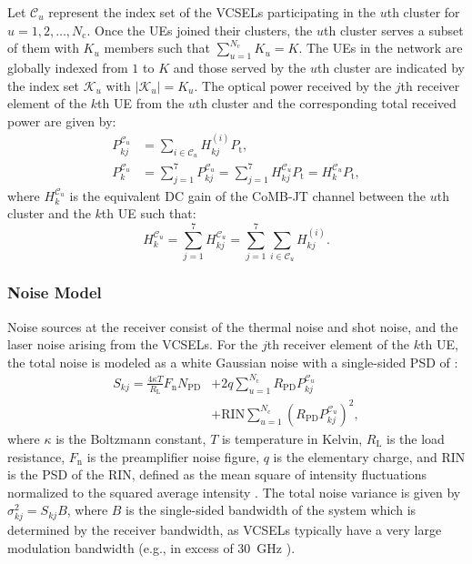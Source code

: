 \documentclass[lettersize,journal]{IEEEtran}
\begin{document}
Let $\mathcal{C}_u$ represent the index set of the \acp{VCSEL} participating in the $u$th cluster for $u=1,2,\dots,N_\mathrm{c}$. Once the \acp{UE} joined their clusters, the $u$th cluster serves a subset of them with $K_u$ members such that $\sum\limits_{u=1}^{N_\mathrm{c}}K_u=K$. The \acp{UE} in the network are globally indexed from $1$ to $K$ and those served by the $u$th cluster are indicated by the index set $\mathcal{K}_u$ with $\lvert\mathcal{K}_u\rvert=K_u$. The optical power received by the $j$th receiver element of the $k$th \ac{UE} from the $u$th cluster and the corresponding total received power are given by:
\begin{subequations}
    \begin{align}
        P_{kj}^{\mathcal{C}_u} &= \sum_{i\in\mathcal{C}_u}H_{kj}^{(i)}P_\mathrm{t}, \\
        P_k^{\mathcal{C}_u} &= \sum_{j=1}^{7}P_{kj}^{\mathcal{C}_u} = \sum_{j=1}^{7}H_{kj}^{\mathcal{C}_u}P_\mathrm{t} = H_{k}^{\mathcal{C}_u}P_\mathrm{t},
    \end{align}
\end{subequations}
where $H_{k}^{\mathcal{C}_u}$ is the equivalent \ac{DC} gain of the \ac{CoMB}-\ac{JT} channel between the $u$th cluster and the $k$th \ac{UE} such that:
%
\begin{equation}
    H_{k}^{\mathcal{C}_u} = \sum_{j=1}^{7}H_{kj}^{\mathcal{C}_u} = \sum_{j=1}^{7}\sum_{i\in\mathcal{C}_u}H_{kj}^{(i)}.
    \label{Eq:Hk_Cu}
\end{equation}
%
\subsubsection{Noise Model}
Noise sources at the receiver consist of the thermal noise and shot noise, and the laser noise arising from the \acp{VCSEL}. For the $j$th receiver element of the $k$th \ac{UE}, the total noise is modeled as a white Gaussian noise with a single-sided \ac{PSD} of \cite{ESarbazi2020tb}:
%
\begin{equation}
\begin{split}
	S_{kj} =\frac{4\kappa T}{R_\mathrm{L}}F_\mathrm{n}N_\mathrm{PD} &+2q\sum_{u=1}^{N_\mathrm{c}}R_\mathrm{PD} P_{kj}^{\mathcal{C}_u} \\
	&+\mathrm{RIN}\sum_{u=1}^{N_\mathrm{c}}\left(R_\mathrm{PD} P_{kj}^{\mathcal{C}_u}\right)^{\!2},
 \end{split}
	\label{Eq:S_kj}
\end{equation}
%
where $\kappa$ is the Boltzmann constant, $T$ is temperature in Kelvin, $R_\mathrm{L}$ is the load resistance, $F_\mathrm{n}$ is the preamplifier noise figure, $q$ is the elementary charge, and $\mathrm{RIN}$ is the \ac{PSD} of the \ac{RIN}, defined as the mean square of intensity fluctuations normalized to the squared average intensity \cite{LColdren2012}. The total noise variance is given by $\sigma_{kj}^2=S_{kj}B$, where $B$ is the single-sided bandwidth of the system which is determined by the receiver bandwidth, as \acp{VCSEL} typically have a very large modulation bandwidth (e.g., in excess of $30$~GHz \cite{NLedentsov2022VCSEL}).
\end{document}
